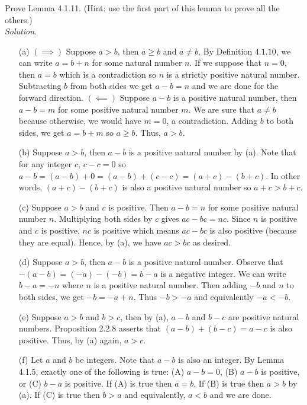 \documentclass{amsart}
\theoremstyle{definition}
\newcommand{\soln}{\newline\textit{Solution.} }
\begin{document}
\subsubsection{} Prove Lemma 4.1.11. (Hint: use the first part of this lemma to prove all the others.) \\
\soln 
\begin{enumerate}
\item[(a)] $(\implies)$ Suppose $a>b$, then $a\geq b$ and $a\neq b$. By Definition $4.1.10$, we can write $a=b+n$ for some natural number $n$. If we suppose that $n=0$, then $a=b$ which is a contradiction so $n$ is a strictly positive natural number. Subtracting $b$ from both sides we get $a-b=n$ and we are done for the forward direction. $(\impliedby)$ Suppose $a-b$ is a positive natural number, then $a-b=m$ for some positive natural number $m$. We are sure that $a\neq b$ because otherwise, we would have $m=0$, a contradiction. Adding $b$ to both sides, we get $a=b+m$ so $a\geq b$. Thus, $a>b$. \\
\item[(b)] Suppose $a>b$, then $a-b$ is a positive natural number by (a). Note that for any integer $c$, $c-c=0$ so $a-b=(a-b)+0=(a-b)+(c-c)=(a+c)-(b+c)$. In other words, $(a+c)-(b+c)$ is also a positive natural number so $a+c>b+c$. \\
\item[(c)] Suppose $a>b$ and $c$ is positive. Then $a-b=n$ for some positive natural number $n$. Multiplying both sides by $c$ gives $ac-bc=nc$. Since $n$ is positive and $c$ is positive, $nc$ is positive which means $ac-bc$ is also positive (because they are equal). Hence, by (a), we have $ac>bc$ as desired.
\item[(d)] Suppose $a>b$, then $a-b$ is a positive natural number. Observe that $-(a-b)=(-a)-(-b)=b-a$ is a negative integer. We can write $b-a=-n$ where $n$ is a positive natural number. Then adding $-b$ and $n$ to both sides, we get $-b=-a+n$. Thus $-b>-a$ and equivalently $-a<-b$.
\item[(e)] Suppose $a>b$ and $b>c$, then by (a), $a-b$ and $b-c$ are positive natural numbers. Proposition 2.2.8 asserts that $(a-b)+(b-c)=a-c$ is also positive. Thus, by (a) again, $a>c$.
\item[(f)] Let $a$ and $b$ be integers. Note that $a-b$ is also an integer. By Lemma 4.1.5, exactly one of the following is true: (A) $a-b=0$, (B) $a-b$ is positive, or (C) $b-a$ is positive. If (A) is true then $a=b$. If (B) is true then $a>b$ by (a). If (C) is true then $b>a$ and equivalently, $a<b$ and we are done. \\
\end{enumerate}
\end{document}
